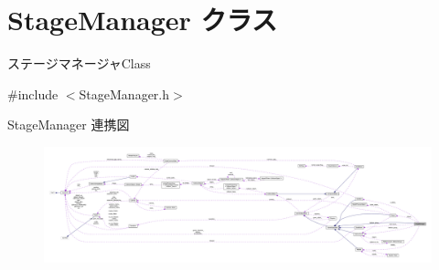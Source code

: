 \hypertarget{class_stage_manager}{}\section{Stage\+Manager クラス}
\label{class_stage_manager}


ステージマネージャ\+Class  




{\ttfamily \#include $<$Stage\+Manager.\+h$>$}



Stage\+Manager 連携図\nopagebreak
\begin{figure}[H]
\begin{center}
\leavevmode
\includegraphics[width=350pt]{class_stage_manager__coll__graph}
\end{center}
\end{figure}
